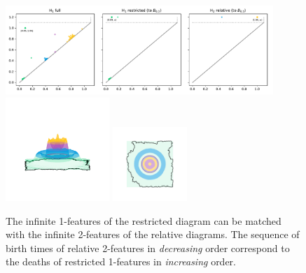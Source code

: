 \begin{figure}[htbp]
  \centering
  \includegraphics[width=0.9\textwidth]{figures/relative/dgm-0_1.pdf}
  \includegraphics[trim=500 800 500 800, clip, width=0.35\textwidth]{figures/relative/surf_side-0_1.png}
  \includegraphics[trim=500 500 500 500, clip, width=0.25\textwidth]{figures/relative/surf_top-0_1.png}
  \caption{The infinite 1-features of the restricted diagram can be matched with the infinite 2-features of the relative diagrams.
  The sequence of birth times of relative 2-features in \emph{decreasing} order correspond to the deaths of restricted 1-features in \emph{increasing} order.}\label{fig:relative2}
\end{figure}
